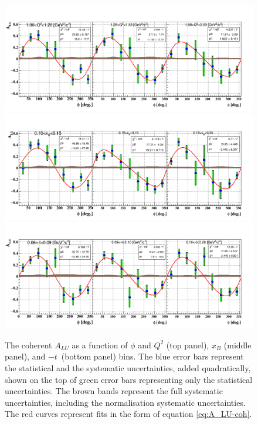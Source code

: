 \begin{figure}[tpb]
\centering
\includegraphics[scale=0.42]{fig_ch5/coh_alu_Q2_phi.png} 
\includegraphics[scale=0.42]{fig_ch5/coh_alu_xB_phi.png}
\includegraphics[scale=0.42]{fig_ch5/coh_alu_t_phi.png}
\caption{The coherent $A_{LU}$ as a function of $\phi$ and $Q^2$ (top panel), 
   $x_{B}$ (middle panel), and $-t$~(bottom panel) bins. The blue error bars 
   represent the statistical and the systematic uncertainties, added 
quadratically, shown on the top of green error bars representing only the 
statistical uncertainties. The brown bands represent the full systematic 
uncertainties, including the normalisation systematic uncertainties. The red 
curves represent fits in the form of equation \ref{eq:A_LU-coh}.}
\label{fig:bsa_coh_Q2_bins}
\end{figure}

